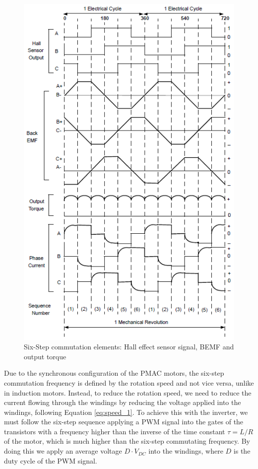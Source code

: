 \begin{figure}[htbp]
\centering
\includegraphics[width=\textwidth]{Images/6step.png} 
\caption[Six Step Commutation]{Six-Step commutation elements: Hall effect sensor signal, BEMF and output torque}
\label{fig:six_step}
\end{figure}

Due to the synchronous configuration of the \ac{PMAC} motors, the six-step commutation frequency is defined by the rotation speed and not vice versa, unlike in induction motors. Instead, to reduce the rotation speed, we need to reduce the current flowing through the windings by reducing the voltage applied into the windings, following Equation \ref{eq:speed_1}. To achieve this with the inverter, we must follow the six-step sequence applying a \ac{PWM} signal into the gates of the transistors with a frequency higher than the inverse of the time constant $\tau = L/R$ of the motor, which is much higher than the six-step commutating frequency. By doing this we apply an average voltage $D\cdot V_{DC}$ into the windings, where $D$ is the duty cycle of the \ac{PWM} signal.

